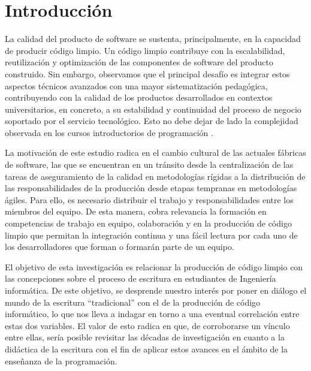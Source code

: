 \documentclass[spanish]{textolivre}
\begin{document}
\begin{polyabstract}
\begin{english}
\begin{abstract}
\end{abstract}
\end{english}
\end{polyabstract}

\section{Introducción}\label{sec-intro}
La calidad del producto de software se sustenta, principalmente, en la capacidad de producir código limpio. Un código limpio contribuye con la escalabilidad, reutilización y optimización de las componentes de software del producto construido. Sin embargo, observamos que el principal desafío es integrar estos aspectos técnicos avanzados con una mayor sistematización pedagógica, contribuyendo con la calidad de los productos desarrollados en contextos universitarios, en concreto, a su estabilidad y continuidad del proceso de negocio soportado por el servicio tecnológico. Esto no debe dejar de lado la complejidad observada en los cursos introductorios de programación \cite{figueiredo2022strategies}.

La motivación de este estudio radica en el cambio cultural de las actuales fábricas de software, las que se encuentran en un tránsito desde la centralización de las tareas de aseguramiento de la calidad en metodologías rígidas a la distribución de las responsabilidades de la producción desde etapas tempranas en metodologías ágiles. Para ello, es necesario distribuir el trabajo y responsabilidades entre los miembros del equipo. De esta manera, cobra relevancia la formación en competencias de trabajo en equipo, colaboración y en la producción de código limpio que permitan la integración continua y una fácil lectura por cada uno de los desarrolladores que forman o formarán parte de un equipo.


El objetivo de esta investigación es relacionar la producción de código limpio con las concepciones sobre el proceso de escritura en estudiantes de Ingeniería informática. De este objetivo, se desprende nuestro interés por poner en diálogo el mundo de la escritura “tradicional” con el de la producción de código informático, lo que nos lleva a indagar en torno a una eventual correlación entre estas dos variables. El valor de esto radica en que, de corroborarse un vínculo entre ellas, sería posible revisitar las décadas de investigación en cuanto a la didáctica de la escritura con el fin de aplicar estos avances en el ámbito de la enseñanza de la programación. 
\end{document}
